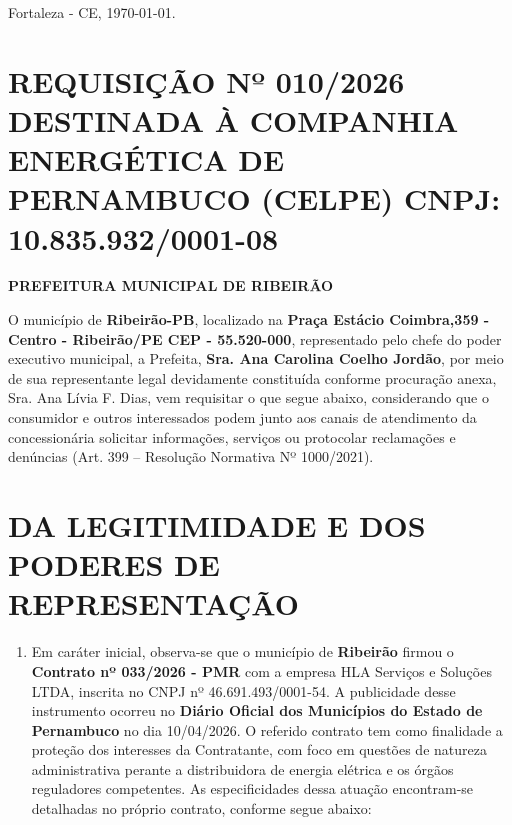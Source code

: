 \documentclass[11pt,a4paper]{article}
\begin{document}
\begin{flushright}
Fortaleza - CE, \today.
\end{flushright}

\section{REQUISIÇÃO Nº 010/2026 DESTINADA À COMPANHIA ENERGÉTICA DE PERNAMBUCO (CELPE) CNPJ: 10.835.932/0001-08}
\vspace{-0.4cm}
\textbf{PREFEITURA MUNICIPAL DE RIBEIRÃO}

\vspace{0.5cm}

O município de \textbf{Ribeirão-PB}, localizado na \textbf{Praça Estácio Coimbra,359 - Centro - Ribeirão/PE CEP - 55.520-000}, representado pelo chefe do poder executivo municipal, a Prefeita, \textbf{Sra. Ana Carolina Coelho Jordão}, por meio de sua representante legal devidamente constituída conforme procuração anexa, Sra. Ana Lívia F. Dias, vem requisitar o que segue abaixo, considerando que o consumidor e outros interessados podem junto aos canais de atendimento da concessionária solicitar informações, serviços ou protocolar reclamações e denúncias (Art. 399 -- Resolução Normativa Nº 1000/2021).

\section{DA LEGITIMIDADE E DOS PODERES DE REPRESENTAÇÃO}

\begin{enumerate}
\item
  Em caráter inicial, observa-se que o município de \textbf{Ribeirão} firmou o \textbf{Contrato nº 033/2026 - PMR} com a empresa HLA Serviços e Soluções LTDA, inscrita no CNPJ nº 46.691.493/0001-54. A publicidade desse instrumento ocorreu no \textbf{Diário Oficial dos Municípios do Estado de Pernambuco} no dia 10/04/2026. O referido contrato tem como finalidade a proteção dos interesses da Contratante, com foco em questões de natureza administrativa perante a distribuidora de energia elétrica e os órgãos reguladores competentes. As especificidades dessa atuação encontram-se detalhadas no próprio contrato, conforme segue abaixo:
\end{enumerate}
\end{document}
